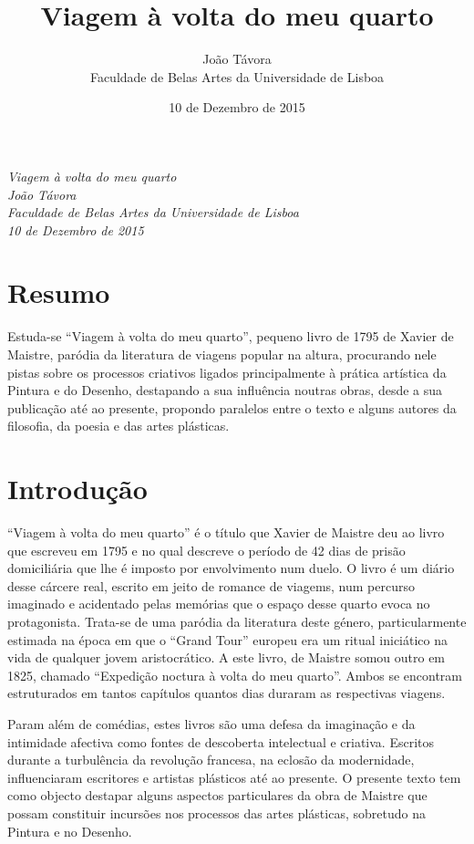 \documentclass[12pt]{article}
\title{Viagem à volta do meu quarto}
\date{10 de Dezembro de 2015}
\author{João Távora \\Faculdade de Belas Artes da Universidade de Lisboa}
\begin{document}

\emph{Viagem à volta do meu quarto}\\
\emph{João Távora}\\
\emph{Faculdade de Belas Artes da Universidade de Lisboa}\\
\emph{10 de Dezembro de 2015}\\

\section{Resumo}

Estuda-se ``Viagem à volta do meu quarto'', pequeno livro de 1795 de
Xavier de Maistre, paródia da literatura de viagens popular na altura,
procurando nele pistas sobre os processos criativos ligados
principalmente à prática artística da Pintura e do Desenho, destapando
a sua influência noutras obras, desde a sua publicação até ao
presente, propondo paralelos entre o texto e alguns autores da
filosofia, da poesia e das artes plásticas.

\section{Introdução}

``Viagem à volta do meu quarto'' é o título que Xavier de Maistre deu
ao livro que escreveu em 1795 e no qual descreve o período de 42 dias
de prisão domiciliária que lhe é imposto por envolvimento num duelo. O
livro é um diário desse cárcere real, escrito em jeito de romance de
viagems, num percurso imaginado e acidentado pelas memórias que o
espaço desse quarto evoca no protagonista. Trata-se de uma paródia da
literatura deste género, particularmente estimada na época em que o
``Grand Tour'' europeu era um ritual iniciático na vida de qualquer
jovem aristocrático. A este livro, de Maistre somou outro em 1825,
chamado ``Expedição noctura à volta do meu quarto''. Ambos se
encontram estruturados em tantos capítulos quantos dias duraram as
respectivas viagens.

Param além de comédias, estes livros são uma defesa da imaginação e da
intimidade afectiva como fontes de descoberta intelectual e
criativa. Escritos durante a turbulência da revolução francesa, na
eclosão da modernidade, influenciaram escritores e artistas plásticos
até ao presente. O presente texto tem como objecto destapar alguns
aspectos particulares da obra de Maistre que possam constituir
incursões nos processos das artes plásticas, sobretudo na Pintura e no
Desenho.
\end{document}

